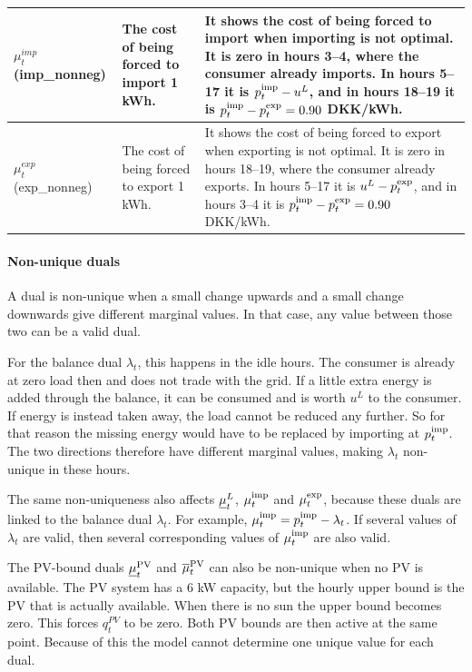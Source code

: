 \begin{xltabular}{\textwidth}{|p{3.2cm}|p{5cm}|X|}
$\mu^{imp}_t$ (imp\_nonneg)
&
The cost of being forced to import 1 kWh.
&
It shows the cost of being forced to import when importing is not optimal. It is zero in hours 3--4, where the consumer already imports.
In hours 5--17 it is $p^{\mathrm{imp}}_{t}-u^L$, and in hours 18--19 it is
$p^{\mathrm{imp}}_{t}-p^{\mathrm{exp}}_{t}=0.90$ DKK/kWh.
\\
\hline

$\mu^{exp}_t$ (exp\_nonneg)
&
The cost of being forced to export 1 kWh.
&
It shows the cost of being forced to export when exporting is not optimal. It is zero in hours 18--19, where the consumer already exports.
In hours 5--17 it is $u^L-p^{\mathrm{exp}}_{t}$, and in hours 3--4 it is
$p^{\mathrm{imp}}_{t}-p^{\mathrm{exp}}_{t}=0.90$ DKK/kWh.

\\
\hline

\end{xltabular}
\paragraph{Non-unique duals}
A dual is non-unique when a small change upwards and a small change downwards give different marginal values. In that case, any value between those two can be a valid dual.

For the balance dual $\lambda_t$, this happens in the idle hours. The consumer is already at zero load then and does not trade with the grid. If a little extra energy is added through the balance, it can be consumed and is worth $u^L$ to the consumer. If energy is instead taken away, the load cannot be reduced any further. So for that reason the missing energy would have to be replaced by importing at $p^{\mathrm{imp}}_{t}$. The two directions therefore have different marginal values, making $\lambda_t$ non-unique in these hours.

The same non-uniqueness also affects $\underline{\mu}^{L}_{t}$, $\mu^{\mathrm{imp}}_{t}$ and $\mu^{\mathrm{exp}}_{t}$, because these duals are linked to the balance dual $\lambda_t$. For example, $\mu^{\mathrm{imp}}_{t}=p^{\mathrm{imp}}_{t}-\lambda_t$. If several values of $\lambda_t$ are valid, then several corresponding values of $\mu^{\mathrm{imp}}_{t}$ are also valid.

The PV-bound duals $\underline{\mu}^{\mathrm{PV}}_{t}$ and $\overline{\mu}^{\mathrm{PV}}_{t}$ can also be non-unique when no PV is available. The PV system has a 6 kW capacity, but the hourly upper bound is the PV that is actually available. When there is no sun the upper bound becomes zero. This forces $q_t^{PV}$ to be zero. Both PV bounds are then active at the same point. Because of this the model cannot determine one unique value for each dual.

